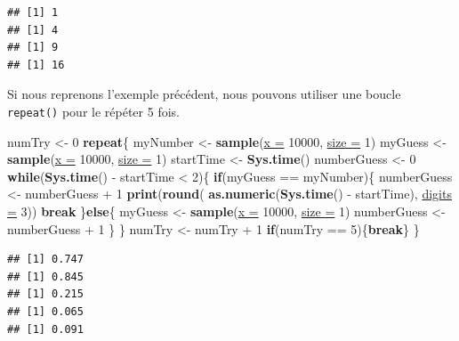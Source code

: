 \documentclass[twoside,symmetric]{book}
\newenvironment{Shaded}{}{}
\newcommand{\ControlFlowTok}[1]{\textbf{#1}}
\newcommand{\DataTypeTok}[1]{\underline{#1}}
\newcommand{\DecValTok}[1]{#1}
\newcommand{\KeywordTok}[1]{\textbf{#1}}
\newcommand{\NormalTok}[1]{#1}
\newcommand{\OperatorTok}[1]{#1}
\newcommand{\StringTok}[1]{#1}
\begin{document}
\begin{verbatim}
## [1] 1
## [1] 4
## [1] 9
## [1] 16
\end{verbatim}

Si nous reprenons l'exemple précédent, nous pouvons utiliser une boucle \texttt{repeat()} pour le répéter 5 fois.

\begin{Shaded}
\begin{Highlighting}[]
\NormalTok{numTry <-}\StringTok{ }\DecValTok{0}
\ControlFlowTok{repeat}\NormalTok{\{}
\NormalTok{  myNumber <-}\StringTok{ }\KeywordTok{sample}\NormalTok{(}\DataTypeTok{x =} \DecValTok{10000}\NormalTok{, }\DataTypeTok{size =} \DecValTok{1}\NormalTok{)}
\NormalTok{  myGuess <-}\StringTok{ }\KeywordTok{sample}\NormalTok{(}\DataTypeTok{x =} \DecValTok{10000}\NormalTok{, }\DataTypeTok{size =} \DecValTok{1}\NormalTok{)}
\NormalTok{  startTime <-}\StringTok{ }\KeywordTok{Sys.time}\NormalTok{()}
\NormalTok{  numberGuess <-}\StringTok{ }\DecValTok{0}
  \ControlFlowTok{while}\NormalTok{(}\KeywordTok{Sys.time}\NormalTok{() }\OperatorTok{-}\StringTok{ }\NormalTok{startTime }\OperatorTok{<}\StringTok{ }\DecValTok{2}\NormalTok{)\{}
    \ControlFlowTok{if}\NormalTok{(myGuess }\OperatorTok{==}\StringTok{ }\NormalTok{myNumber)\{}
\NormalTok{      numberGuess <-}\StringTok{ }\NormalTok{numberGuess }\OperatorTok{+}\StringTok{ }\DecValTok{1}
      \KeywordTok{print}\NormalTok{(}\KeywordTok{round}\NormalTok{(}
        \KeywordTok{as.numeric}\NormalTok{(}\KeywordTok{Sys.time}\NormalTok{() }\OperatorTok{-}\StringTok{ }\NormalTok{startTime), }
        \DataTypeTok{digits =} \DecValTok{3}\NormalTok{))}
      \ControlFlowTok{break}
\NormalTok{    \}}\ControlFlowTok{else}\NormalTok{\{}
\NormalTok{      myGuess <-}\StringTok{ }\KeywordTok{sample}\NormalTok{(}\DataTypeTok{x =} \DecValTok{10000}\NormalTok{, }\DataTypeTok{size =} \DecValTok{1}\NormalTok{)}
\NormalTok{      numberGuess <-}\StringTok{ }\NormalTok{numberGuess }\OperatorTok{+}\StringTok{ }\DecValTok{1}
\NormalTok{    \}}
\NormalTok{  \}}
\NormalTok{  numTry <-}\StringTok{ }\NormalTok{numTry }\OperatorTok{+}\StringTok{ }\DecValTok{1}
  \ControlFlowTok{if}\NormalTok{(numTry }\OperatorTok{==}\StringTok{ }\DecValTok{5}\NormalTok{)\{}\ControlFlowTok{break}\NormalTok{\}}
\NormalTok{\}}
\end{Highlighting}
\end{Shaded}

\begin{verbatim}
## [1] 0.747
## [1] 0.845
## [1] 0.215
## [1] 0.065
## [1] 0.091
\end{verbatim}
\end{document}
